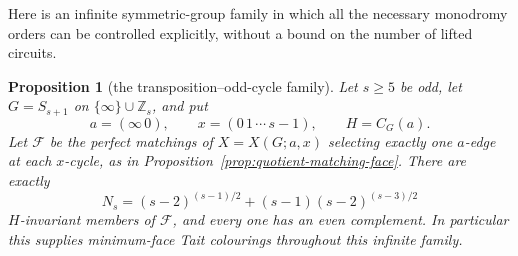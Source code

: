 \documentclass[11pt,a4paper]{article}
\newtheorem{proposition}[theorem]{Proposition}
\theoremstyle{definition}
\theoremstyle{remark}
\newcommand{\ZZ}{\mathbb{Z}}
\newcommand{\X}[3]{X(#1;#2,#3)}
\begin{document}
Here is an infinite symmetric-group family in which all the necessary monodromy orders can be controlled explicitly, without a bound on the number of lifted circuits.
\begin{proposition}[the transposition--odd-cycle family]\label{prop:transposition-monodromy}
Let $s\ge5$ be odd, let $G=S_{s+1}$ on $\{\infty\}\cup\ZZ_s$, and put
\[
 a=(\infty\,0),\qquad x=(0\,1\,\cdots\,s-1),\qquad H=C_G(a).
\]
Let $\mathcal F$ be the perfect matchings of $X=\X{G}{a}{x}$ selecting exactly one $a$-edge at each $x$-cycle, as in Proposition~\ref{prop:quotient-matching-face}.  There are exactly
\[
 N_s=(s-2)^{(s-1)/2}+(s-1)(s-2)^{(s-3)/2}
\]
$H$-invariant members of $\mathcal F$, and \emph{every one} has an even complement.  In particular this supplies minimum-face Tait colourings throughout this infinite family.
\end{proposition}
\end{document}
